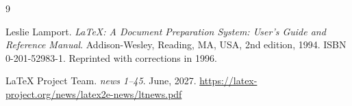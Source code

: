 \documentclass{ltnews}
\begin{document}

\begin{thebibliography}{9}\frenchspacing


Leslie Lamport.
\newblock \emph{{\LaTeX}: {A} Document Preparation System: User's Guide and Reference
  Manual}.
\newblock \mbox{Addison}-Wesley, Reading, MA, USA, 2nd edition, 1994.
\newblock ISBN 0-201-52983-1.
\newblock Reprinted with corrections in 1996.

 \LaTeX{} Project Team.
  \emph{\LaTeXe{} news 1--45}. June, 2027.
  \url{https://latex-project.org/news/latex2e-news/ltnews.pdf}

\end{thebibliography}
\end{document}
